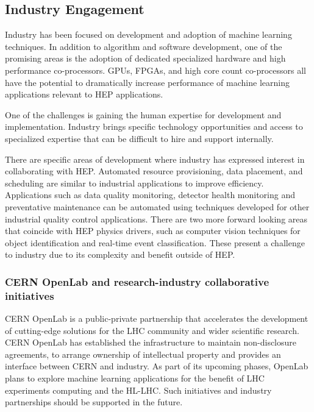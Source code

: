 
\subsection{Industry Engagement}
Industry has been focused on development and adoption of machine learning techniques. In addition to algorithm and software development, one of the promising areas is the adoption of dedicated specialized hardware and high performance co-processors. GPUs, FPGAs, and high core count co-processors all have the potential to dramatically increase performance of machine learning applications relevant to HEP applications.

One of the challenges is gaining the human expertise for development and implementation. Industry brings specific technology opportunities and access to specialized expertise that can be difficult to hire and support internally.

There are specific areas of development where industry has expressed interest in collaborating with HEP.  Automated resource provisioning, data placement, and scheduling are similar to industrial applications to improve efficiency. Applications such as data quality monitoring, detector health monitoring and preventative maintenance can be automated using techniques developed for other industrial quality control applications. There are two more forward looking areas that coincide with HEP physics drivers, such as computer vision techniques for object identification and real-time event classification. These present a challenge to industry due to its complexity and benefit outside of HEP.



\subsubsection{CERN OpenLab and research-industry collaborative initiatives}
CERN OpenLab is a public-private partnership that accelerates the development of cutting-edge solutions for the LHC community and wider scientific research. CERN OpenLab has established the infrastructure to maintain non-disclosure agreements, to arrange ownership of intellectual property and provides an interface between CERN and industry. As part of its upcoming phases, OpenLab plans to explore machine learning applications for the benefit of LHC experiments computing and the HL-LHC. Such initiatives and industry partnerships should be supported in the future.

